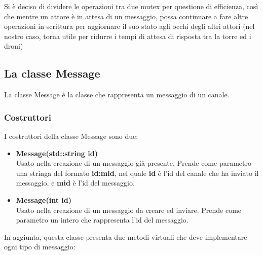 \documentclass[a4paper, 11pt]{article}
\begin{document}
Si è deciso di dividere le operazioni tra due mutex per questione di efficienza, così che mentre un attore è in attesa di un messaggio,
possa continuare a fare altre operazioni in scrittura per aggiornare il suo stato agli occhi degli altri attori (nel nostro caso, 
torna utile per ridurre i tempi di attesa di risposta tra la torre ed i droni)
\subsection{La classe Message}
La classe Message è la classe che rappresenta un messaggio di un canale.
\subsubsection{Costruttori}
I costruttori della classe Message sono due:
\begin{itemize}
    
    \item \textbf{Message(std::string id)}\\
        Usato nella creazione di un messaggio già presente.
        Prende come parametro una stringa del formato \textbf{id:mid}, nel quale \textbf{id} è l'id del canale che ha inviato il messaggio, e \textbf{mid} è l'id del messaggio.

    \item \textbf{Message(int id)}\\
        Usato nella creazione di un messaggio da creare ed inviare.
        Prende come parametro un intero che rappresenta l'id del messaggio.

\end{itemize}
In aggiunta, questa classe presenta due metodi virtuali che deve implementare ogni tipo di messaggio:\\
\end{document}
